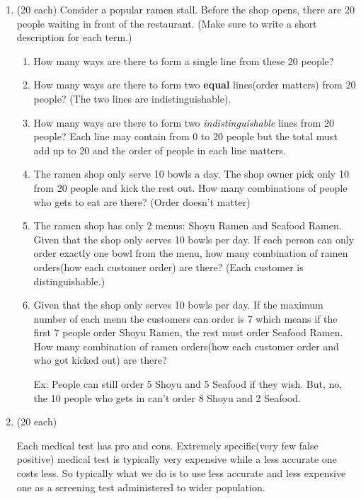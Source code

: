 \documentclass[a4paper, 12pt]{article}
\newcommand{\sanswer}{\vspace{1.25in}}
\begin{document}
\begin{enumerate}
	\newpage 
	\item (20 each) Consider a popular ramen stall. Before the shop opens, there are 20 people waiting in front of the restaurant. (Make sure to write a short description for each term.)
	\begin{enumerate}
		\item How many ways are there to form a single line from these 20 people?
		\sanswer
		\item How many ways are there to form two \textbf{equal} lines(order matters) from 20 people? (The two lines are indistinguishable).
		\sanswer
		\item How many ways are there to form two \emph{indistinguishable} lines from 20 people? Each line may contain from 0 to 20 people but the total must add up to 20 and the order of people in each line matters.
		\sanswer
		\item The ramen shop only serve 10 bowls a day. The shop owner pick only 10 from 20 people and kick the rest out. How many combinations of people who gets to eat are there? (Order doesn't matter)
		\sanswer
		\item The ramen shop has only 2 menus: Shoyu Ramen and Seafood Ramen. Given that the shop only serves 10 bowls per day. If each person can only order exactly one bowl from the menu, how many combination of ramen orders(how each customer order) are there? (Each customer is distinguishable.)
		\sanswer
		\newpage
		\item Given that the shop only serves 10 bowls per day. If the maximum number of each menu the customers can order is 7 which means if the first 7 people order Shoyu Ramen, the rest must order Seafood Ramen. How many combination of ramen orders(how each customer order and who got kicked out) are there?
		
		Ex: People can still order 5 Shoyu and 5 Seafood if they wish.
		But, no, the 10 people who gets in can't order 8 Shoyu and 2 Seafood.
		
		\sanswer
	\end{enumerate}
		
	\newpage
	
	\item (20 each)
	
	Each medical test has pro and cons. Extremely specific(very few false positive) medical test is typically very expensive while a less accurate one costs less. So typically what we do is to use less accurate and less expensive one as a screening test administered to wider population.
	

\end{enumerate}
\end{document}
